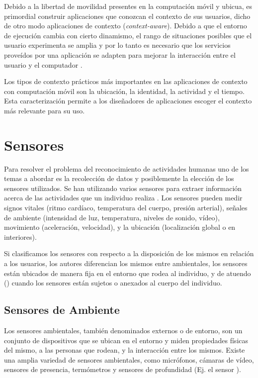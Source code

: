 Debido a la libertad de movilidad presentes en la computación móvil
y ubicua, es primordial construir aplicaciones que conozcan el contexto
de sus usuarios, dicho de otro modo aplicaciones de contexto (\emph{context-aware}).
Debido a que el entorno de ejecución cambia con cierto dinamismo,
el rango de situaciones posibles que el usuario experimenta se amplia
y por lo tanto es necesario que los servicios proveídos por una aplicación
se adapten para mejorar la interacción entre el usuario y el computador
\cite{Dey2000}.

Los tipos de contexto prácticos más importantes en las aplicaciones
de contexto con computación móvil son la ubicación, la identidad,
la actividad y el tiempo. Esta caracterización permite a los diseñadores
de aplicaciones escoger el contexto más relevante para su uso.

\section{Sensores}

\label{sec23:sensores} Para resolver el problema del reconocimiento
de actividades humanas uno de los temas a abordar es la recolección
de datos y posiblemente la elección de los sensores utilizados. Se
han utilizando varios sensores para extraer información acerca de
las actividades que un individuo realiza \cite{Chen2012,LaraLabrador2012}.
Los sensores pueden medir signos vitales (ritmo cardíaco, temperatura
del cuerpo, presión arterial), señales de ambiente (intensidad de
luz, temperatura, niveles de sonido, vídeo), movimiento (aceleración,
velocidad), y la ubicación (localización global o en interiores). 

Si clasificamos los sensores con respecto a la disposición de los
mismos en relación a los usuarios, los autores \cite{ReyesOrtiz2015,LaraLabrador2013}
diferencian los mismos entre ambientales, los sensores están ubicados
de manera fija en el entorno que rodea al individuo, y de atuendo
(\emph{}) cuando los sensores están sujetos o anexados
al cuerpo del individuo.

\subsection{Sensores de Ambiente}

Los sensores ambientales, también denominados externos o de entorno,
son un conjunto de dispositivos que se ubican en el entorno y miden
propiedades físicas del mismo, a las personas que rodean, y la interacción
entre los mismos. Existe una amplia variedad de sensores ambientales,
como micrófonos, cámaras de vídeo, sensores de presencia, termómetros
y sensores de profundidad (Ej. el sensor ). 

